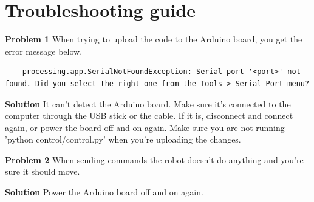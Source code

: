 \documentclass[12pt]{article}
\begin{document}
\section{Troubleshooting guide}
	\textbf{Problem 1} When trying to upload the code to the Arduino board, you get the error message below.
	\begin{lstlisting}
	processing.app.SerialNotFoundException: Serial port '<port>' not found. Did you select the right one from the Tools > Serial Port menu?
	\end{lstlisting}
	
	\bigskip
	
	\textbf{Solution}  It can't detect the Arduino board. Make sure it's connected to the computer through the USB stick or the cable. If it is, disconnect and connect again, or power the board off and on again. Make sure you are not running 'python control/control.py' when you're uploading the changes.
	\bigskip

	\textbf{Problem 2} When sending commands the robot doesn't do anything and you're sure it should move.
	\bigskip
	
	\textbf{Solution} Power the Arduino board off and on again.

 
\end{document}
